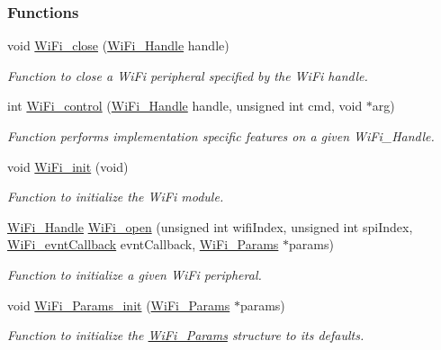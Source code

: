 \subsubsection*{Functions}
\begin{DoxyCompactItemize}
\item 
void \hyperlink{_wi_fi_8h_a463c68dfbe1ad861adfd073942fcac46}{Wi\+Fi\+\_\+close} (\hyperlink{_wi_fi_8h_a2969512dbfbf2a383ac8c1a9cf01a95c}{Wi\+Fi\+\_\+\+Handle} handle)
\begin{DoxyCompactList}\small\item\em Function to close a Wi\+Fi peripheral specified by the Wi\+Fi handle. \end{DoxyCompactList}\item 
int \hyperlink{_wi_fi_8h_a1f42a1e174ed1682b7de43ec6f043bf7}{Wi\+Fi\+\_\+control} (\hyperlink{_wi_fi_8h_a2969512dbfbf2a383ac8c1a9cf01a95c}{Wi\+Fi\+\_\+\+Handle} handle, unsigned int cmd, void $\ast$arg)
\begin{DoxyCompactList}\small\item\em Function performs implementation specific features on a given Wi\+Fi\+\_\+\+Handle. \end{DoxyCompactList}\item 
void \hyperlink{_wi_fi_8h_a306a67ecbf66c31b31ee62a7170c563c}{Wi\+Fi\+\_\+init} (void)
\begin{DoxyCompactList}\small\item\em Function to initialize the Wi\+Fi module. \end{DoxyCompactList}\item 
\hyperlink{_wi_fi_8h_a2969512dbfbf2a383ac8c1a9cf01a95c}{Wi\+Fi\+\_\+\+Handle} \hyperlink{_wi_fi_8h_a74bfb46543ca040aabea15dc58f16e92}{Wi\+Fi\+\_\+open} (unsigned int wifi\+Index, unsigned int spi\+Index, \hyperlink{_wi_fi_8h_a6441e73863c7f533a09c508e44734e09}{Wi\+Fi\+\_\+evnt\+Callback} evnt\+Callback, \hyperlink{struct_wi_fi___params}{Wi\+Fi\+\_\+\+Params} $\ast$params)
\begin{DoxyCompactList}\small\item\em Function to initialize a given Wi\+Fi peripheral. \end{DoxyCompactList}\item 
void \hyperlink{_wi_fi_8h_a89959d0d9640421ee0b8c68eca240ae0}{Wi\+Fi\+\_\+\+Params\+\_\+init} (\hyperlink{struct_wi_fi___params}{Wi\+Fi\+\_\+\+Params} $\ast$params)
\begin{DoxyCompactList}\small\item\em Function to initialize the \hyperlink{struct_wi_fi___params}{Wi\+Fi\+\_\+\+Params} structure to its defaults. \end{DoxyCompactList}\end{DoxyCompactItemize}


